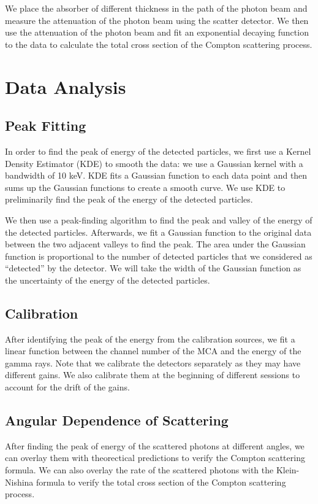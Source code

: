 We place the absorber of different thickness in the path of the photon beam and measure the attenuation of the photon beam using the scatter detector. We then use the attenuation of the photon beam and fit an exponential decaying function to the data to calculate the total cross section of the Compton scattering process. 


\section{Data Analysis}
\subsection{Peak Fitting}
In order to find the peak of energy of the detected particles, we first use a Kernel Density Estimator (KDE) to smooth the data: we use a Gaussian kernel with a bandwidth of 10 keV. KDE fits a Gaussian function to each data point and then sums up the Gaussian functions to create a smooth curve. We use KDE to preliminarily find the peak of the energy of the detected particles. 

We then use a peak-finding algorithm to find the peak and valley of the energy of the detected particles. Afterwards, we fit a Gaussian function to the original data between the two adjacent valleys to find the peak. The area under the Gaussian function is proportional to the number of detected particles that we considered as ``detected'' by the detector. We will take the width of the Gaussian function as the uncertainty of the energy of the detected particles.

\subsection{Calibration}
After identifying the peak of the energy from the calibration sources, we fit a linear function between the channel number of the MCA and the energy of the gamma rays. Note that we calibrate the detectors separately as they may have different gains. We also calibrate them at the beginning of different sessions to account for the drift of the gains.

\subsection{Angular Dependence of Scattering}
After finding the peak of energy of the scattered photons at different angles, we can overlay them with theorectical predictions to verify the Compton scattering formula. We can also overlay the rate of the scattered photons with the Klein-Nishina formula to verify the total cross section of the Compton scattering process. 

